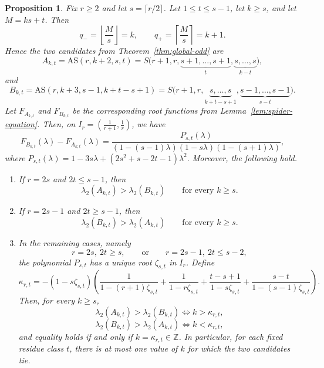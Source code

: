 \documentclass[10pt,a4paper]{amsart}
\newtheorem{proposition}{Proposition}
\newcommand{\AS}{\mathrm{AS}}
\begin{document}
\begin{proposition}\label{prop:single-threshold}
Fix $r\ge 2$ and let $s=\lceil r/2\rceil$.
Let $1\le t\le s-1$, let $k\ge s$, and let $M=ks+t$.
Then
$$
q_-=\left\lfloor \frac{M}{s}\right\rfloor=k,
\qquad
q_+=\left\lceil \frac{M}{s}\right\rceil=k+1.
$$
Hence the two candidates from Theorem~\ref{thm:global-odd} are
$$
A_{k,t}=\AS(r,k+2,s,t)
=S\bigl(r+1,r,\underbrace{s+1,\dots,s+1}_{t},\underbrace{s,\dots,s}_{k-t}\bigr),
$$
and
$$
B_{k,t}=\AS(r,k+3,s-1,k+t-s+1)
=S\bigl(r+1,r,\underbrace{s,\dots,s}_{k+t-s+1},\underbrace{s-1,\dots,s-1}_{s-t}\bigr).
$$
Let $F_{A_{k,t}}$ and $F_{B_{k,t}}$ be the corresponding root functions from Lemma~\ref{lem:spider-equation}.
Then, on $I_r=\left(\frac1{r+1},\frac1r\right)$,
we have
\begin{equation}\label{eq:single-threshold-difference}
F_{B_{k,t}}(\lambda)-F_{A_{k,t}}(\lambda)
=
\frac{P_{s,t}(\lambda)}{(1-(s-1)\lambda)(1-s\lambda)(1-(s+1)\lambda)},
\end{equation}
where
$P_{s,t}(\lambda)=1-3s\lambda+(2s^2+s-2t-1)\lambda^2.$
Moreover, the following hold.
\begin{enumerate}[label=\textnormal{(\roman*)}]
    \item If $r=2s$ and $2t\le s-1$, then
    $$
    \lambda_2(A_{k,t})>\lambda_2(B_{k,t})
    \qquad\text{for every }k\ge s.
    $$
    \item If $r=2s-1$ and $2t\ge s-1$, then
    $$
    \lambda_2(B_{k,t})>\lambda_2(A_{k,t})
    \qquad\text{for every }k\ge s.
    $$
    \item In the remaining cases, namely
    $$
    r=2s,\ 2t\ge s,
    \qquad\text{or}\qquad
    r=2s-1,\ 2t\le s-2,
    $$
    the polynomial $P_{s,t}$ has a unique root $\zeta_{s,t}$ in $I_r$.
    Define
    $$
    \kappa_{r,t}
    =-(1-s\zeta_{s,t})\left(
    \frac{1}{1-(r+1)\zeta_{s,t}}
    +\frac{1}{1-r\zeta_{s,t}}
    +\frac{t-s+1}{1-s\zeta_{s,t}}
    +\frac{s-t}{1-(s-1)\zeta_{s,t}}
    \right).
    $$
    Then, for every $k\ge s$,
    $$
    \lambda_2(A_{k,t})>\lambda_2(B_{k,t})\iff k>\kappa_{r,t},
    $$
    $$
    \lambda_2(B_{k,t})>\lambda_2(A_{k,t})\iff k<\kappa_{r,t},
    $$
    and equality holds if and only if $k=\kappa_{r,t}\in\mathbb Z$.
    In particular, for each fixed residue class $t$, there is at most one value of $k$ for which the two candidates tie.
\end{enumerate}
\end{proposition}
\end{document}
